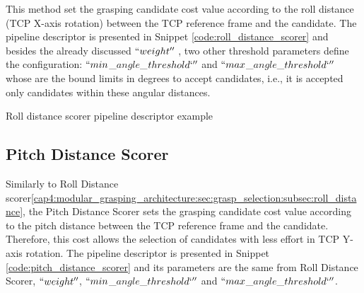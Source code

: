 This method set the grasping candidate cost value according to the roll distance (TCP X-axis rotation) between the TCP reference frame and the candidate. The pipeline descriptor is presented in Snippet \ref{code:roll_distance_scorer} and besides the already discussed $``weight''$ , two other threshold parameters define the configuration: $``min$\_$angle$\_$threshold`''$ and $``max$\_$angle$\_$threshold`''$ whose are the bound limits in degrees to accept candidates, i.e., it is accepted only candidates within these angular distances.


%


\begin{snippet}[h!]
\centering
{}
\caption{Roll distance scorer pipeline descriptor example}
\label{code:roll_distance_scorer}
\end{snippet}

\subsection{Pitch Distance Scorer}
\label{cap4:modular_grasping_architecture:sec:grasp_selection:subsec:pitch_distance}

Similarly to Roll Distance scorer\ref{cap4:modular_grasping_architecture:sec:grasp_selection:subsec:roll_distance}, the Pitch Distance Scorer sets the grasping candidate cost value according to the pitch distance between the TCP reference frame and the candidate. Therefore, this cost allows the selection of candidates with less effort in TCP Y-axis rotation. The pipeline descriptor is presented in Snippet \ref{code:pitch_distance_scorer} and its parameters are the same from Roll Distance Scorer, $``weight''$, $``min$\_$angle$\_$threshold`''$ and $``max$\_$angle$\_$threshold`''$.



